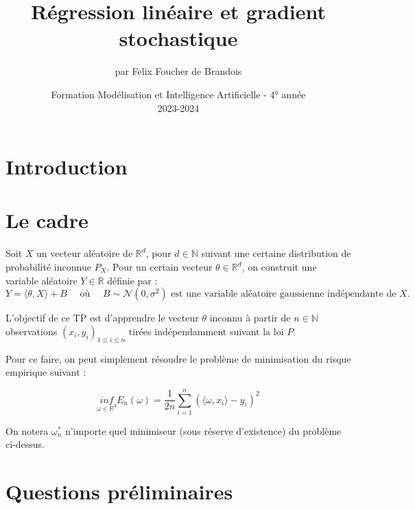 \documentclass[12pt,a4paper]{article}
\begin{document}
\title{\vspace{4cm} \textbf{Régression linéaire et gradient stochastique}}

\author{par Felix Foucher de Brandois}
     
\date{\vspace{10cm} Formation Modélisation et Intelligence Artificielle - 4° année \\
2023-2024 }

\maketitle

\newpage
\tableofcontents
\listoffigures

\newpage

\section{Introduction}


\section{Le cadre}
Soit $X$ un vecteur aléatoire de $\mathbb{R}^d$, pour $d \in \mathbb{N}$ suivant une certaine distribution de probabilité inconnue $P_X$. Pour un certain vecteur $\theta \in \mathbb{R}^d$, on construit une variable aléatoire $Y \in \mathbb{R}$ définie par :
$$
Y = \langle \theta, X\rangle + B \quad \text{ où } \quad B \sim \mathcal{N}(0, \sigma^2) \text{ est une variable aléatoire gaussienne indépendante de } X.
$$

L’objectif de ce TP est d’apprendre le vecteur $\theta$ inconnu à partir de $n \in \mathbb{N}$ observations $(x_i, y_i)_{1 \leq i \leq n}$ tirées indépendamment suivant la loi $P$.

Pour ce faire, on peut simplement résoudre le problème de minimisation du risque empirique suivant :

\begin{equation}
    \underset{\omega \in \mathbb{R}^d}{inf} E_n(\omega) = \frac{1}{2n} \sum_{i = 1}^{n} (\langle \omega, x_i \rangle - y_i)^2
    \label{eq:1}
\end{equation}

On notera $\omega_n^*$ n’importe quel minimiseur (sous réserve d’existence) du problème ci-dessus.

\section{Questions préliminaires}
\end{document}
